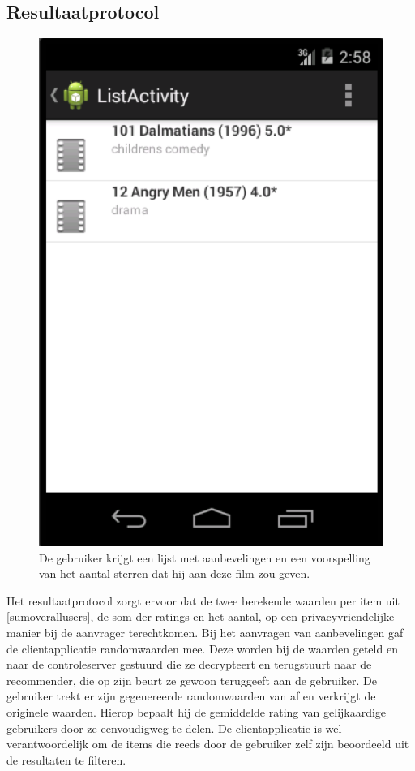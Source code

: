 \subsection{Resultaatprotocol}
\label{result}

\begin{figure}[htpb]   
    \label{Figuur::recommendations}      
  \begin{center}    
 \includegraphics[scale=0.5]{fig/recommendations}    
  \end{center}   
  \caption{De gebruiker krijgt een lijst met aanbevelingen en een voorspelling van het aantal sterren dat hij aan deze film zou geven.}  
   \end{figure}
   
Het resultaatprotocol zorgt ervoor dat de twee berekende waarden per item uit \ref{sumoverallusers}, de som der ratings en het aantal, op een privacyvriendelijke manier bij de aanvrager terechtkomen. Bij het aanvragen van aanbevelingen gaf de clientapplicatie randomwaarden mee. Deze worden bij de waarden geteld en naar de controleserver gestuurd die ze decrypteert en terugstuurt naar de recommender, die op zijn beurt ze gewoon teruggeeft aan de gebruiker. De gebruiker trekt er zijn gegenereerde randomwaarden van af en verkrijgt de originele waarden. Hierop bepaalt hij de gemiddelde rating van gelijkaardige gebruikers door ze eenvoudigweg te delen. De clientapplicatie is wel verantwoordelijk om de items die reeds door de gebruiker zelf zijn beoordeeld uit de resultaten te filteren.
